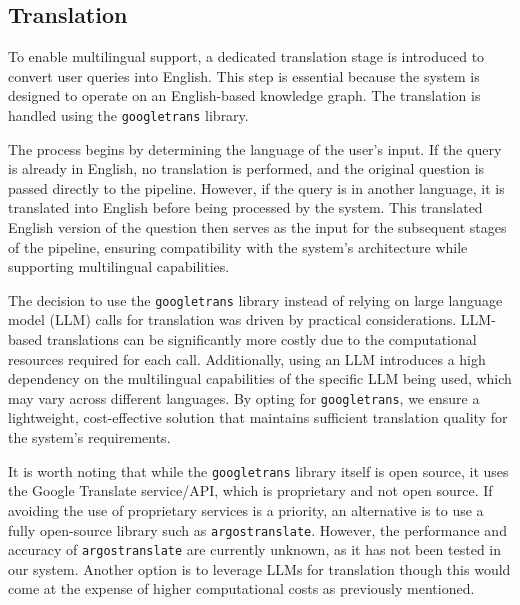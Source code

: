 \subsection{Translation}
\label{translation}
To enable multilingual support, a dedicated translation stage is introduced to convert user queries into English. This step is essential because the system is designed to operate on an English-based knowledge graph. The translation is handled using the \texttt{googletrans} library.

The process begins by determining the language of the user’s input. If the query is already in English, no translation is performed, and the original question is passed directly to the pipeline. However, if the query is in another language, it is translated into English before being processed by the system. This translated English version of the question then serves as the input for the subsequent stages of the pipeline, ensuring compatibility with the system's architecture while supporting multilingual capabilities.

The decision to use the \texttt{googletrans} library instead of relying on large language model (LLM) calls for translation was driven by practical considerations. LLM-based translations can be significantly more costly due to the computational resources required for each call. Additionally, using an LLM introduces a high dependency on the multilingual capabilities of the specific LLM being used, which may vary across different languages. By opting for \texttt{googletrans}, we ensure a lightweight, cost-effective solution that maintains sufficient translation quality for the system's requirements.

It is worth noting that while the \texttt{googletrans} library itself is open source, it uses the Google Translate service/API, which is proprietary and not open source. If avoiding the use of proprietary services is a priority, an alternative is to use a fully open-source library such as \texttt{argostranslate}. However, the performance and accuracy of \texttt{argostranslate} are currently unknown, as it has not been tested in our system. Another option is to leverage LLMs for translation though this would come at the expense of higher computational costs as previously mentioned.

